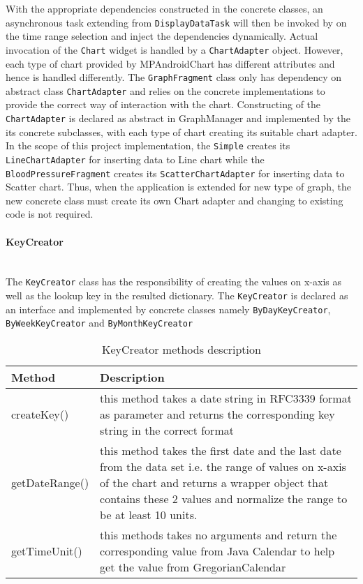 With the appropriate dependencies constructed in the concrete classes, an asynchronous task extending from
\texttt{DisplayDataTask} will then be invoked by on the time range selection and inject the dependencies dynamically.
Actual invocation of the \texttt{Chart} widget is handled by a \texttt{ChartAdapter} object. However, each type of
chart provided by MPAndroidChart has different attributes and hence is handled differently. The \texttt{GraphFragment}
class only has dependency on abstract class \texttt{ChartAdapter} and relies on the concrete implementations to provide
the correct way of interaction with the chart. Constructing of the \texttt{ChartAdapter} is declared as abstract in
GraphManager and implemented by the its concrete subclasses, with each type of chart creating its suitable chart
adapter. In the scope of this project implementation, the \texttt{Simple} creates its \texttt{LineChartAdapter} for
inserting data to Line chart while the \texttt{BloodPressureFragment} creates its \texttt{ScatterChartAdapter} for
inserting data to Scatter chart. Thus, when the application is extended for new type of graph, the new concrete class
must create its own Chart adapter and changing to existing code is not required.

\paragraph{KeyCreator}\mbox{} \\
The \texttt{KeyCreator} class has the responsibility of creating the values on x-axis as well as the lookup key in the
resulted dictionary. The \texttt{KeyCreator} is declared as an interface and implemented by concrete classes namely
\texttt{ByDayKeyCreator}, \texttt{ByWeekKeyCreator} and \texttt{ByMonthKeyCreator}

\begin{table}
\begin{center}
    \begin{tabularx}{\textwidth}{| l | X |}
        \hline Method & Description \\
        \hline createKey() & 
            this method takes a date string in RFC3339 format as parameter and returns the corresponding key string in
            the correct format \\
        \hline getDateRange() &
            this method takes the first date and the last date from the data set i.e. the range of values on x-axis of
            the chart and returns a wrapper object that contains these 2 values and normalize the range to be at least
            10 units. \\
        \hline getTimeUnit() &
            this methods takes no arguments and return the corresponding value from Java Calendar to help get the value
            from GregorianCalendar \\
        \hline
    \end{tabularx}
\end{center}
    \caption{KeyCreator methods description}
\end{table}


